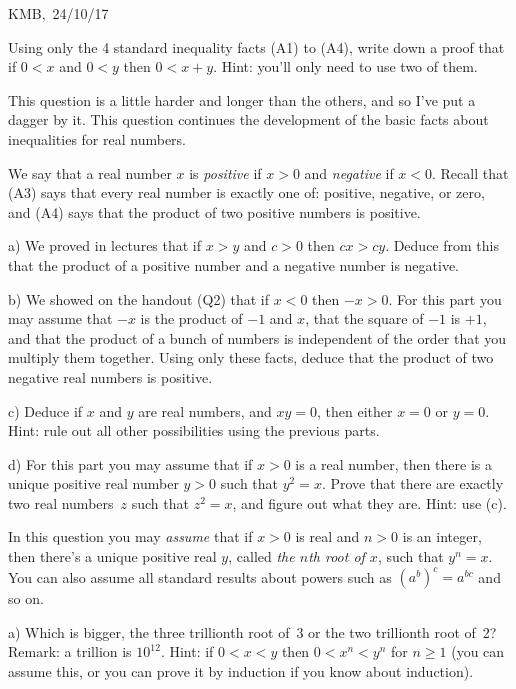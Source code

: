 \documentclass[10pt]{article}
\begin{document}
\begin{flushright} KMB,\ 24/10/17\end{flushright}


\medskip
{} Using only the 4 standard inequality facts (A1) to (A4), write down a proof that if $0<x$ and $0<y$ then $0<x+y$. Hint: you'll only need to use two of them. 

\medskip
{} This question is a little harder and longer than the others, and so I've put a dagger by it. This question continues the development of the basic facts about inequalities for real numbers.

We say that a real number $x$ is \emph{positive} if $x>0$ and \emph{negative} if $x<0$. Recall that (A3) says that every real number is exactly one of: positive, negative, or zero, and (A4) says that the product of two positive numbers is positive. 

a) We proved in lectures that if $x>y$ and $c>0$ then $cx>cy$. Deduce from this that the product of a positive number and a negative number is negative.

b) We showed on the handout (Q2) that if $x<0$ then $-x>0$. For this part you may assume that $-x$ is the product of $-1$ and $x$, that the square of $-1$ is $+1$, and that the product of a bunch of numbers is independent of the order that you multiply them together. Using only these facts, deduce that the product of two negative real numbers is positive.

c) Deduce if $x$ and $y$ are real numbers, and $xy=0$, then either $x=0$ or $y=0$. Hint: rule out all other possibilities using the previous parts.

d) For this part you may assume that if $x>0$ is a real number, then there is a unique positive real number $y>0$ such that $y^2=x$. Prove that there are exactly two real numbers~$z$ such that $z^2=x$, and figure out what they are. Hint: use (c).

\medskip
{} In this question you may \emph{assume} that if $x>0$ is real and $n>0$ is an integer, then there's a unique positive real $y$, called \emph{the $n$th root of $x$}, such that $y^n=x$. You can also assume all standard results about powers such as $\left(a^b\right)^c=a^{bc}$ and so on.

a) Which is bigger, the three trillionth root of~3 or the two trillionth root of~2? Remark: a trillion is $10^{12}$. Hint: if $0<x<y$ then $0<x^n<y^n$ for $n\geq1$ (you can assume this, or you can prove it by induction if you know about induction).
\end{document}
